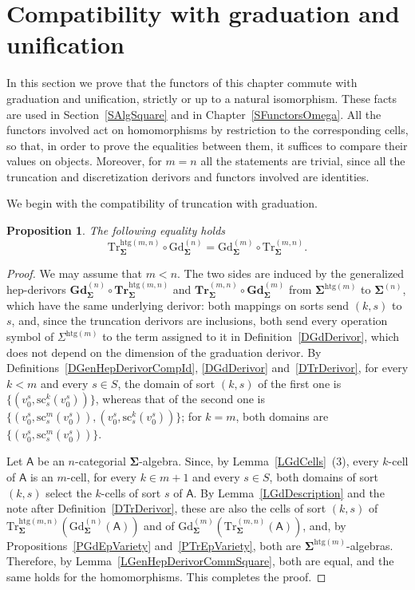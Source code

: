 \documentclass[a4paper, reqno]{amsbook}
\newcommand{\sig}[1]{\mathbf{#1}}             %
\newcommand{\calg}[1]{\boldsymbol{\mathsf{#1}}} %
\newcommand{\htg}{\mathrm{htg}}                %
\newcommand{\src}{\mathrm{sc}}
\newcommand{\Gd}{\mathrm{Gd}}
\newcommand{\Tr}{\mathrm{Tr}}
\newcommand{\bGd}{\mathbf{Gd}}
\newcommand{\bTr}{\mathbf{Tr}}
\theoremstyle{plain}
\newtheorem{proposition}[theorem]{Proposition}
\theoremstyle{definition}
\begin{document}
\section{Compatibility with graduation and unification}\label{SDsTrCompatGdUf}

In this section we prove that the functors of this chapter commute with graduation and unification, strictly or up to a natural isomorphism.
These facts are used in Section~\ref{SAlgSquare} and in Chapter~\ref{SFunctorsOmega}.
All the functors involved act on homomorphisms by restriction to the corresponding cells, so that, in order to prove the equalities between them, it suffices to compare their values on objects.
Moreover, for $m=n$ all the statements are trivial, since all the truncation and discretization derivors and functors involved are identities.

We begin with the compatibility of truncation with graduation.

\begin{proposition}\label{PCompatGdTr}
The following equality holds
$$
\Tr^{\htg(m,n)}_{\sig{\Sigma}}\circ\Gd^{(n)}_{\sig{\Sigma}}=\Gd^{(m)}_{\sig{\Sigma}}\circ \Tr^{(m,n)}_{\sig{\Sigma}}.
$$
\end{proposition}
\begin{proof}
We may assume that $m<n$.
The two sides are induced by the generalized hep-derivors $\bGd^{(n)}_{\sig{\Sigma}}\circ\bTr^{\htg(m,n)}_{\sig{\Sigma}}$ and $\bTr^{(m,n)}_{\sig{\Sigma}}\circ\bGd^{(m)}_{\sig{\Sigma}}$ from $\sig{\Sigma}^{\htg(m)}$ to $\sig{\Sigma}^{(n)}$, which have the same underlying derivor: both mappings on sorts send $(k,s)$ to $s$, and, since the truncation derivors are inclusions, both send every operation symbol of $\Sigma^{\htg(m)}$ to the term assigned to it in Definition~\ref{DGdDerivor}, which does not depend on the dimension of the graduation derivor.
By Definitions~\ref{DGenHepDerivorCompId}, \ref{DGdDerivor} and~\ref{DTrDerivor}, for every $k<m$ and every $s\in S$, the domain of sort $(k,s)$ of the first one is $\{(v^s_0,\src^k_s(v^s_0))\}$, whereas that of the second one is $\{(v^s_0,\src^m_s(v^s_0)),(v^s_0,\src^k_s(v^s_0))\}$; for $k=m$, both domains are $\{(v^s_0,\src^m_s(v^s_0))\}$.

Let $\calg{A}$ be an $n$-categorial $\sig{\Sigma}$-algebra.
Since, by Lemma~\ref{LGdCells}~(3), every $k$-cell of $\calg{A}$ is an $m$-cell, for every $k\in m+1$ and every $s\in S$, both domains of sort $(k,s)$ select the $k$-cells of sort $s$ of $\calg{A}$.
By Lemma~\ref{LGdDescription} and the note after Definition~\ref{DTrDerivor}, these are also the cells of sort $(k,s)$ of $\Tr^{\htg(m,n)}_{\sig{\Sigma}}(\Gd^{(n)}_{\sig{\Sigma}}(\calg{A}))$ and of $\Gd^{(m)}_{\sig{\Sigma}}(\Tr^{(m,n)}_{\sig{\Sigma}}(\calg{A}))$, and, by Propositions~\ref{PGdEpVariety} and~\ref{PTrEpVariety}, both are $\sig{\Sigma}^{\htg(m)}$-algebras.
Therefore, by Lemma~\ref{LGenHepDerivorCommSquare}, both are equal, and the same holds for the homomorphisms. This completes the proof.
\end{proof}
\end{document}
